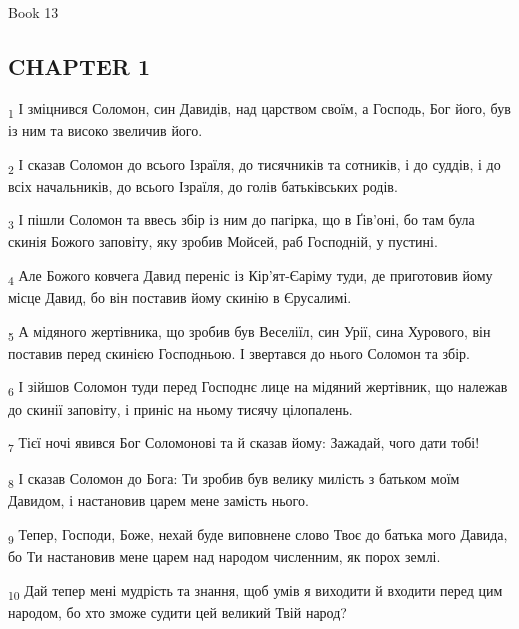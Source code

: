Book 13
\subsection{CHAPTER 1}
\begin{tcolorbox}
\textsubscript{1} І зміцнився Соломон, син Давидів, над царством своїм, а Господь, Бог його, був із ним та високо звеличив його.
\end{tcolorbox}
\begin{tcolorbox}
\textsubscript{2} І сказав Соломон до всього Ізраїля, до тисячників та сотників, і до суддів, і до всіх начальників, до всього Ізраїля, до голів батьківських родів.
\end{tcolorbox}
\begin{tcolorbox}
\textsubscript{3} І пішли Соломон та ввесь збір із ним до пагірка, що в Ґів'оні, бо там була скинія Божого заповіту, яку зробив Мойсей, раб Господній, у пустині.
\end{tcolorbox}
\begin{tcolorbox}
\textsubscript{4} Але Божого ковчега Давид переніс із Кір'ят-Єаріму туди, де приготовив йому місце Давид, бо він поставив йому скинію в Єрусалимі.
\end{tcolorbox}
\begin{tcolorbox}
\textsubscript{5} А мідяного жертівника, що зробив був Веселіїл, син Урії, сина Хурового, він поставив перед скинією Господньою. І звертався до нього Соломон та збір.
\end{tcolorbox}
\begin{tcolorbox}
\textsubscript{6} І зійшов Соломон туди перед Господнє лице на мідяний жертівник, що належав до скинії заповіту, і приніс на ньому тисячу цілопалень.
\end{tcolorbox}
\begin{tcolorbox}
\textsubscript{7} Тієї ночі явився Бог Соломонові та й сказав йому: Зажадай, чого дати тобі!
\end{tcolorbox}
\begin{tcolorbox}
\textsubscript{8} І сказав Соломон до Бога: Ти зробив був велику милість з батьком моїм Давидом, і настановив царем мене замість нього.
\end{tcolorbox}
\begin{tcolorbox}
\textsubscript{9} Тепер, Господи, Боже, нехай буде виповнене слово Твоє до батька мого Давида, бо Ти настановив мене царем над народом численним, як порох землі.
\end{tcolorbox}
\begin{tcolorbox}
\textsubscript{10} Дай тепер мені мудрість та знання, щоб умів я виходити й входити перед цим народом, бо хто зможе судити цей великий Твій народ?
\end{tcolorbox}
